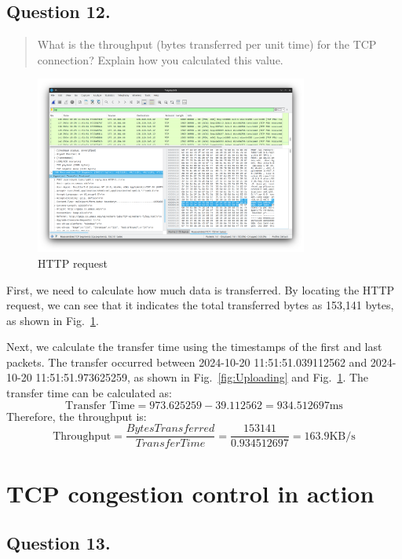 \documentclass{cshwk}
\begin{document}
\subsection*{Question 12.}
\begin{quote}
    What is the throughput (bytes transferred per unit time) for the TCP connection? Explain how you calculated this value.
\end{quote}

\begin{figure}[htbp]
    \centering
    \includegraphics[width=0.8\textwidth]{./lab3-11.png}
    \caption{HTTP request}
    \label{fig:HTTP}
\end{figure}

First, we need to calculate how much data is transferred. By locating the HTTP request, we can see that it indicates the total transferred bytes as 153,141 bytes, as shown in Fig.~\ref{fig:HTTP}.

Next, we calculate the transfer time using the timestamps of the first and last packets. The transfer occurred between 2024-10-20 11:51:51.039112562 and 2024-10-20 11:51:51.973625259, as shown in Fig.~\ref{fig:Uploading} and Fig.~\ref{fig:HTTP}. The transfer time can be calculated as:
\[
    \text{Transfer Time} = 973.625259 - 39.112562 = 934.512697 \text{ms}
\]
Therefore, the throughput is:
\[
    \text{Throughput} =\frac{Bytes Transferred}{Transfer Time} = \frac{153141}{0.934512697} = 163.9 \text{KB/s}
\]

\section{TCP congestion control in action}

\subsection*{Question 13.}
\end{document}
